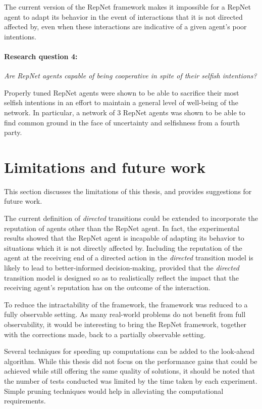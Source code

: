 \noindent The current version of the RepNet framework makes it impossible for a RepNet agent to adapt its behavior in the event of interactions that it is not directed affected by, even when these interactions are indicative of a given agent's poor intentions.

\paragraph{Research question 4:} \textit{Are RepNet agents capable of being cooperative in spite of their selfish intentions?}

\noindent Properly tuned RepNet agents were shown to be able to sacrifice their most selfish intentions in an effort to maintain a general level of well-being of the network. In particular, a network of 3 RepNet agents was shown to be able to find common ground in the face of uncertainty and selfishness from a fourth party.

\section{Limitations and future work}
This section discusses the limitations of this thesis, and provides suggestions for future work.

The current definition of \textit{directed} transitions could be extended to incorporate the reputation of agents other than the RepNet agent. In fact, the experimental results showed that the RepNet agent is incapable of adapting its behavior to situations which it is not directly affected by. 
Including the reputation of the agent at the receiving end of a directed action in the \textit{directed} transition model
is likely to lead to better-informed decision-making, provided that the \textit{directed} transition model is designed so as to realistically reflect the impact that the receiving agent's reputation has on the outcome of the interaction.


To reduce the intractability of the framework, the framework was reduced to a fully observable setting. As many real-world problems do not benefit from full observability, it would be interesting to bring the RepNet framework, together with the corrections made, back to a partially observable setting.

Several techniques for speeding up computations can be added to the look-ahead algorithm. While this thesis did not focus on the performance gains that could be achieved while still offering the same quality of solutions, it should be noted that the number of tests conducted was limited by the time taken by each experiment. Simple pruning techniques would help in alleviating the computational requirements.

